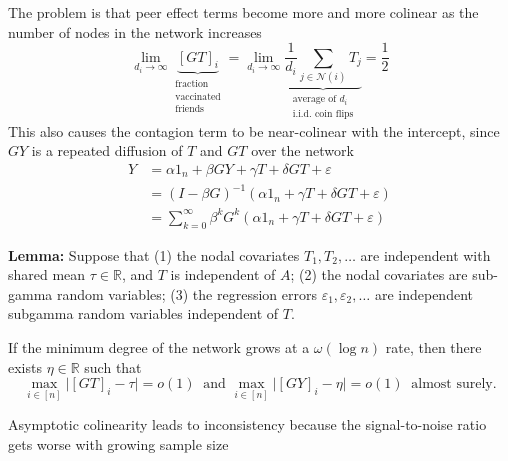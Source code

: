 \documentclass[final]{beamer}
\newcommand{\Ni}{\mathcal N(i)}
\newcommand{\R}{\mathbb{R}}
\newlength{\colwidth}
\begin{document}
\begin{frame}[t]
\begin{columns}[t]
\begin{column}{\colwidth}
\begin{block}{The problem is that peer effect terms become more and more colinear as the number of nodes in the network increases}
                \begin{equation} \label{eq:avg}
                    \lim_{d_i \to \infty}
                    \underbrace{[GT]_i}_{\substack{\text{fraction} \\ \text{vaccinated} \\ \text{friends}}}
                    =
                    \lim_{d_i \to \infty}
                    \underbrace{
                        \frac{1}{d_i} \sum_{j \in \Ni} T_j
                    }_{\substack{\text{average of $d_i$}           \\ \text{i.i.d. coin flips}}}
                    = \frac 12
                \end{equation}
                This also causes the contagion term to be near-colinear with the intercept, since $GY$ is a repeated diffusion of $T$ and $GT$ over the network
                \begin{align*}
                    Y & = \alpha 1_n + \beta G Y + \gamma T + \delta G T + \varepsilon                            \\
                      & = \left(I - \beta G\right)^{-1} \left(\alpha 1_n + \gamma T + \delta G T + \varepsilon\right)     \\
                      & = \sum_{k=0}^\infty \beta^k G^k \left(\alpha 1_n + \gamma T + \delta G T + \varepsilon\right)
                \end{align*}

                \textbf{Lemma:} Suppose that (1) the nodal covariates $T_1, T_2, \dots$ are independent with shared mean $\tau \in \R$, and $T$ is independent of $A$; (2) the nodal covariates are sub-gamma random variables; (3) the regression errors $\varepsilon_1, \varepsilon_2, \dots$ are independent subgamma random variables independent of $T$.

                If the minimum degree of the network grows at a $\omega(\log n)$ rate, then there exists $\eta \in \R$ such that
                \begin{equation*}
                    \max_{i \in [n]} \Big| [GT]_i - \tau \Big|
                    = o(1) ~ \text{ and }
                    \max_{i \in [n]} \Big| [GY]_i - \eta \Big| = o(1)~ \text{ almost surely.}
                \end{equation*}
            \end{block}

            \begin{block}{Asymptotic colinearity leads to inconsistency because the signal-to-noise ratio gets worse with growing sample size}


\end{block}
\end{column}
\end{columns}
\end{frame}
\end{document}
